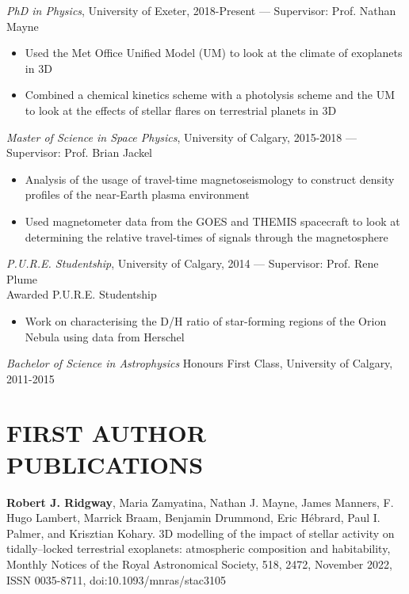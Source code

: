 \documentclass[letter, margin, 10pt]{res} %
\begin{document}
\begin{resume}
{\sl PhD in Physics}, University of Exeter, 2018-Present --- Supervisor: Prof. Nathan Mayne\\
\begin{itemize}[noitemsep,topsep=0pt,parsep=0pt,partopsep=0pt]
\item Used the Met Office Unified Model (UM) to look at the climate of exoplanets in 3D
\item Combined a chemical kinetics scheme with a photolysis scheme and the UM to look at the effects of stellar flares on terrestrial planets in 3D
\end{itemize}
\vspace{-10pt}
{\sl Master of Science in Space Physics}, University of Calgary, 2015-2018 --- Supervisor: Prof. Brian Jackel
\begin{itemize}[noitemsep,topsep=0pt,parsep=0pt,partopsep=0pt]
\item Analysis of the usage of travel-time magnetoseismology to construct density profiles of the near-Earth plasma environment
\item Used magnetometer data from the GOES and THEMIS spacecraft to look at determining the relative travel-times of signals  through the magnetosphere
\end{itemize}
\vspace{-10pt}
{\sl P.U.R.E. Studentship}, University of Calgary, 2014 --- Supervisor: Prof. Rene Plume\\
\null\quad\quad Awarded P.U.R.E. Studentship
\begin{itemize}[noitemsep,topsep=0pt,parsep=0pt,partopsep=0pt]
\item Work on characterising the D/H ratio of star-forming regions of the Orion Nebula using data from Herschel
\end{itemize}
\vspace{-10pt}
{\sl Bachelor of Science in Astrophysics} Honours First Class, University of Calgary, 2011-2015




\section{FIRST AUTHOR PUBLICATIONS}

\textbf{Robert J. Ridgway}, Maria Zamyatina, Nathan J. Mayne, James Manners, F. Hugo Lambert, Marrick Braam, Benjamin Drummond, Eric H\'{e}brard, Paul I. Palmer, and Krisztian Kohary. 3D modelling of the impact of stellar activity on tidally–locked terrestrial exoplanets: atmospheric composition and
habitability, Monthly Notices of the Royal Astronomical Society, 518, 2472, November 2022, ISSN 0035-8711, doi:10.1093/mnras/stac3105


\end{resume}
\end{document}
